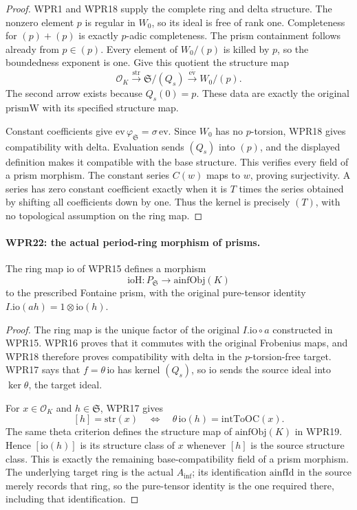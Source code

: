 \documentclass[11pt,a4paper]{article}
\numberwithin{equation}{section}
\theoremstyle{remark}\newtheorem{remark}[theorem]{Remark}
\begin{document}
\begin{proof}
WPR1 and WPR18 supply the complete ring and delta structure.
The nonzero element $p$ is regular in $W_0$, so its ideal is
free of rank one. Completeness for $(p)+(p)$ is exactly
$p$-adic completeness. The prism containment follows already
from $p\in(p)$. Every element of $W_0/(p)$ is killed by $p$,
so the boundedness exponent is one. Give this quotient the
structure map
\[
 \mathcal O_K\xrightarrow{\mathrm{str}}
 \mathfrak S/(Q_s)\xrightarrow{\overline{\mathrm{ev}}}W_0/(p).
\]
The second arrow exists because $Q_s(0)=p$. These data are
exactly the original $\mathrm{prismW}$ with its specified
structure map.

Constant coefficients give
$\mathrm{ev}\,\varphi_{\mathfrak S}=\sigma\,\mathrm{ev}$.
Since $W_0$ has no $p$-torsion, WPR18 gives compatibility with
delta. Evaluation sends $(Q_s)$ into $(p)$, and the displayed
definition makes it compatible with the base structure. This
verifies every field of a prism morphism. The constant series
$C(w)$ maps to $w$, proving surjectivity. A series has zero
constant coefficient exactly when it is $T$ times the series
obtained by shifting all coefficients down by one. Thus the
kernel is precisely $(T)$, with no topological assumption on
the ring map.
\end{proof}

\paragraph{WPR22: the actual period-ring morphism of prisms.}
\label{claim:WPR22}
The ring map $\mathrm{io}$ of WPR15 defines a morphism
\[
 \mathrm{ioH}:P_{\mathfrak S}\longrightarrow\mathrm{ainfObj}(K)
 \tag{WPR.27}
\]
to the prescribed Fontaine prism, with the original pure-tensor
identity $I.\mathrm{io}(a h)=1\otimes\mathrm{io}(h)$.

\begin{proof}
The ring map is the unique factor of the original
$I.\mathrm{io}\circ a$ constructed in WPR15. WPR16 proves
that it commutes with the original Frobenius maps, and WPR18
therefore proves compatibility with delta in the $p$-torsion-free
target. WPR17 says that $f=\theta\,\mathrm{io}$ has kernel
$(Q_s)$, so $\mathrm{io}$ sends the source ideal into
$\ker\theta$, the target ideal.

For $x\in\mathcal O_K$ and $h\in\mathfrak S$, WPR17 gives
\[
 [h]=\mathrm{str}(x)
 \quad\Longleftrightarrow\quad
 \theta\,\mathrm{io}(h)=\mathrm{intToOC}(x).
\]
The same theta criterion defines the structure map of
$\mathrm{ainfObj}(K)$ in WPR19. Hence $[\mathrm{io}(h)]$
is its structure class of $x$ whenever $[h]$ is the source
structure class. This is exactly the remaining base-compatibility
field of a prism morphism. The underlying target ring is the
actual $A_{\mathrm{inf}}$; its identification $\mathrm{ainfId}$ in the
source merely records that ring, so the pure-tensor identity is
the one required there, including that identification.
\end{proof}
\end{document}
